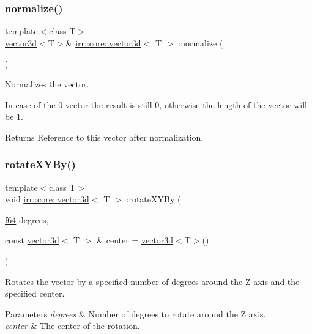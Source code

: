 \subsubsection{\texorpdfstring{normalize()}{normalize()}}
{\footnotesize\ttfamily template$<$class T$>$ \\
\hyperlink{classirr_1_1core_1_1vector3d}{vector3d}$<$T$>$\& \hyperlink{classirr_1_1core_1_1vector3d}{irr\+::core\+::vector3d}$<$ T $>$\+::normalize (\begin{DoxyParamCaption}{ }\end{DoxyParamCaption})\hspace{0.3cm}{\ttfamily [inline]}}



Normalizes the vector. 

In case of the 0 vector the result is still 0, otherwise the length of the vector will be 1. \begin{DoxyReturn}{Returns}
Reference to this vector after normalization. 
\end{DoxyReturn}
\mbox{\label{classirr_1_1core_1_1vector3d_ac38b75735ec06716305fbb09ec71784d}} 
\subsubsection{\texorpdfstring{rotate\+X\+Y\+By()}{rotateXYBy()}}
{\footnotesize\ttfamily template$<$class T$>$ \\
void \hyperlink{classirr_1_1core_1_1vector3d}{irr\+::core\+::vector3d}$<$ T $>$\+::rotate\+X\+Y\+By (\begin{DoxyParamCaption}\item[{\hyperlink{namespaceirr_a1325b02603ad449f92c68fc640af9b28}{f64}}]{degrees,  }\item[{const \hyperlink{classirr_1_1core_1_1vector3d}{vector3d}$<$ T $>$ \&}]{center = {\ttfamily \hyperlink{classirr_1_1core_1_1vector3d}{vector3d}$<$T$>$()} }\end{DoxyParamCaption})\hspace{0.3cm}{\ttfamily [inline]}}



Rotates the vector by a specified number of degrees around the Z axis and the specified center. 


\begin{DoxyParams}{Parameters}
{\em degrees} & Number of degrees to rotate around the Z axis. \\
\hline
{\em center} & The center of the rotation. \\
\hline
\end{DoxyParams}
\mbox{\label{classirr_1_1core_1_1vector3d_a621fbddb42814edd3d14410252cf7b7a}} 
